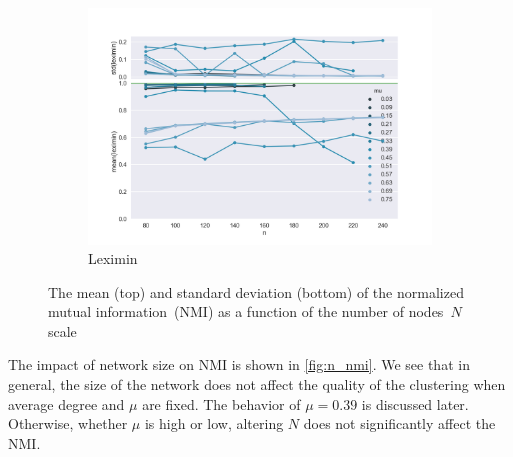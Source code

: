 \begin{figure}
    \begin{subfigure}[b]{0.32\textwidth}
        \includegraphics[width=\textwidth]{fig/nmi_vs_n_leximin}
        \caption{Leximin}
        \label{fig:mouse}
    \end{subfigure}

  \caption{The mean (top) and standard deviation (bottom) of the normalized mutual information~(NMI) as a function of the number of nodes~$N$ scale}
  \label{fig:n_nmi}
\end{figure}

The impact of network size on NMI is shown in \autoref{fig:n_nmi}. We see that in general, the size of the network does not affect the quality of the clustering when average degree and $\mu$ are fixed. The behavior of $\mu = 0.39$ is discussed later. Otherwise, whether $\mu$ is high or low, altering $N$ does not significantly affect the NMI.


